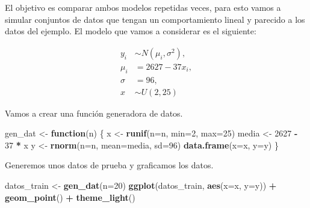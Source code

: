 \documentclass[]{book}
\makeatletter
\newenvironment{Shaded}{\begin{snugshade}}{\end{snugshade}}
\newcommand{\ControlFlowTok}[1]{\textcolor[rgb]{0.13,0.29,0.53}{\textbf{#1}}}
\newcommand{\DataTypeTok}[1]{\textcolor[rgb]{0.13,0.29,0.53}{#1}}
\newcommand{\DecValTok}[1]{\textcolor[rgb]{0.00,0.00,0.81}{#1}}
\newcommand{\KeywordTok}[1]{\textcolor[rgb]{0.13,0.29,0.53}{\textbf{#1}}}
\newcommand{\NormalTok}[1]{#1}
\newcommand{\OperatorTok}[1]{\textcolor[rgb]{0.81,0.36,0.00}{\textbf{#1}}}
\newcommand{\StringTok}[1]{\textcolor[rgb]{0.31,0.60,0.02}{#1}}
\newenvironment{kframe}{%
\medskip{}
\setlength{\fboxsep}{.8em}
 \def\at@end@of@kframe{}%
 \ifinner\ifhmode%
  \def\at@end@of@kframe{\end{minipage}}%
  \begin{minipage}{\columnwidth}%
 \fi\fi%
 \def\FrameCommand##1{\hskip\@totalleftmargin \hskip-\fboxsep
 \colorbox{shadecolor}{##1}\hskip-\fboxsep
     \hskip-\linewidth \hskip-\@totalleftmargin \hskip\columnwidth}%
 \MakeFramed {\advance\hsize-\width
   \@totalleftmargin\z@ \linewidth\hsize
   \@setminipage}}%
 {\par\unskip\endMakeFramed%
 \at@end@of@kframe}
\renewenvironment{Shaded}{\begin{kframe}}{\end{kframe}}
\makeatother
\begin{document}
El objetivo es comparar ambos modelos repetidas veces, para esto vamos a simular conjuntos de datos que tengan un comportamiento lineal y parecido a los datos del ejemplo. El modelo que vamos a considerar es el siguiente:

\begin{align}
y_i &\sim N(\mu_i, \sigma^2), \\ 
\mu_i &= 2627 - 37 x_i, \\
\sigma &= 96, \\
x &\sim U(2, 25)
\end{align}

Vamos a crear una función generadora de datos.

\begin{Shaded}
\begin{Highlighting}[]
\NormalTok{gen_dat <-}\StringTok{ }\ControlFlowTok{function}\NormalTok{(n) \{}
\NormalTok{  x <-}\StringTok{ }\KeywordTok{runif}\NormalTok{(}\DataTypeTok{n=}\NormalTok{n, }\DataTypeTok{min=}\DecValTok{2}\NormalTok{, }\DataTypeTok{max=}\DecValTok{25}\NormalTok{)}
\NormalTok{  media <-}\StringTok{ }\DecValTok{2627} \OperatorTok{-}\StringTok{ }\DecValTok{37} \OperatorTok{*}\StringTok{ }\NormalTok{x}
\NormalTok{  y <-}\StringTok{ }\KeywordTok{rnorm}\NormalTok{(}\DataTypeTok{n=}\NormalTok{n, }\DataTypeTok{mean=}\NormalTok{media, }\DataTypeTok{sd=}\DecValTok{96}\NormalTok{)}
  \KeywordTok{data.frame}\NormalTok{(}\DataTypeTok{x=}\NormalTok{x, }\DataTypeTok{y=}\NormalTok{y)}
\NormalTok{\}}
\end{Highlighting}
\end{Shaded}

Generemos unos datos de prueba y graficamos los datos.

\begin{Shaded}
\begin{Highlighting}[]
\NormalTok{datos_train <-}\StringTok{ }\KeywordTok{gen_dat}\NormalTok{(}\DataTypeTok{n=}\DecValTok{20}\NormalTok{)}
\KeywordTok{ggplot}\NormalTok{(datos_train, }\KeywordTok{aes}\NormalTok{(}\DataTypeTok{x=}\NormalTok{x, }\DataTypeTok{y=}\NormalTok{y)) }\OperatorTok{+}\StringTok{ }
\StringTok{  }\KeywordTok{geom_point}\NormalTok{() }\OperatorTok{+}\StringTok{ }\KeywordTok{theme_light}\NormalTok{()}
\end{Highlighting}
\end{Shaded}
\end{document}
